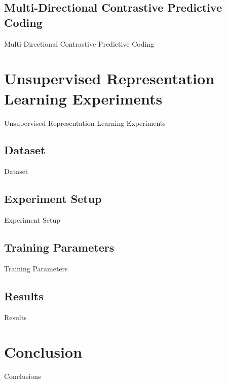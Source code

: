 \subsection{Multi-Directional Contrastive Predictive Coding}
Multi-Directional Contrastive Predictive Coding



\section{Unsupervised Representation Learning Experiments}
Unsupervised Representation Learning Experiments

\subsection{Dataset}
Dataset

\subsection{Experiment Setup}
Experiment Setup

\subsection{Training Parameters}
Training Parameters

\subsection{Results}
Results



\section{Conclusion}
Conclusions